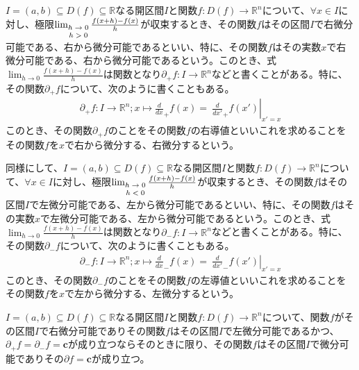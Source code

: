 \documentclass[dvipdfmx]{jsarticle}
\begin{document}
\begin{dfn}
$I = (a,b) \subseteq D(f) \subseteq \mathbb{R}$なる開区間$I$と関数$f:D(f) \rightarrow \mathbb{R}^{n}$について、$\forall x \in I$に対し、極限$\lim_{\scriptsize \begin{matrix}
h \rightarrow 0 \\
h > 0 \\
\end{matrix}}\frac{f(x + h) - f(x)}{h}$が収束するとき、その関数$f$はその区間$I$で右微分可能である、右から微分可能であるといい、特に、その関数$f$はその実数$x$で右微分可能である、右から微分可能であるという。このとき、式$\lim_{h \rightarrow 0}\frac{f(x + h) - f(x)}{h}$は関数となり$\partial_{+}f:I \rightarrow \mathbb{R}^{n}$などと書くことがある。特に、その関数$\partial_{+}f$について、次のように書くこともある。
\begin{align*}
\partial_{+}f:I \rightarrow \mathbb{R}^{n};x \mapsto \frac{d}{dx}_{+}f(x) = \left. \ \frac{d}{dx'}_{+}f\left( x' \right) \right|_{x' = x}
\end{align*}
このとき、その関数$\partial_{+}f$のことをその関数$f$の右導値といいこれを求めることをその関数$f$を$x$で右から微分する、右微分するという。\par
同様にして、$I = (a,b) \subseteq D(f) \subseteq \mathbb{R}$なる開区間$I$と関数$f:D(f) \rightarrow \mathbb{R}^{n}$について、$\forall x \in I$に対し、極限$\lim_{\scriptsize \begin{matrix}
h \rightarrow 0 \\
h < 0 \\
\end{matrix}}\frac{f(x + h) - f(x)}{h}$が収束するとき、その関数$f$はその区間$I$で左微分可能である、左から微分可能であるといい、特に、その関数$f$はその実数$x$で左微分可能である、左から微分可能であるという。このとき、式$\lim_{h \rightarrow 0}\frac{f(x + h) - f(x)}{h}$は関数となり$\partial_{-}f:I \rightarrow \mathbb{R}^{n}$などと書くことがある。特に、その関数$\partial_{-}f$について、次のように書くこともある。
\begin{align*}
\partial_{-}f:I \rightarrow \mathbb{R}^{n};x \mapsto \frac{d}{dx}_{-}f(x) = \left. \ \frac{d}{dx'}_{-}f\left( x' \right) \right|_{x' = x}
\end{align*}
このとき、その関数$\partial_{-}f$のことをその関数$f$の左導値といいこれを求めることをその関数$f$を$x$で左から微分する、左微分するという。
\end{dfn}
\begin{thm}\label{4.2.1.1}
$I = (a,b) \subseteq D(f) \subseteq \mathbb{R}$なる開区間$I$と関数$f:D(f) \rightarrow \mathbb{R}^{n}$について、関数$f$がその区間$I$で右微分可能でありその関数$f$はその区間$I$で左微分可能であるかつ、$\partial_{+}f = \partial_{-}f = \mathbf{c}$が成り立つならそのときに限り、その関数$f$はその区間$I$で微分可能でありその$\partial f = \mathbf{c}$が成り立つ。
\end{thm}
\end{document}
